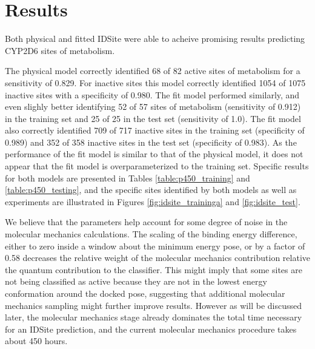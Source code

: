 \section{Results}
\label{section:p450/results}
Both physical and fitted IDSite were able to acheive promising results predicting CYP2D6 sites of metabolism.

The physical model correctly identified 68 of 82 active sites of metabolism for a sensitivity of 0.829.
For inactive sites this model correctly identified 1054 of 1075 inactive sites with a specificity of 0.980.
The fit model performed similarly, and even slighly better identifying 52 of 57 sites of metabolism (sensitivity of 0.912) in the training set and 25 of 25 in the test set (sensitivity of 1.0).
The fit model also correctly identified 709 of 717 inactive sites in the training set (specificity of 0.989) and 352 of 358 inactive sites in the test set (specificity of 0.983).
As the performance of the fit model is similar to that of the physical model, it does not appear that the fit model is overparameterized to the training set.
Specific results for both models are presented in Tables \ref{table:p450_training} and \ref{table:p450_testing}, and the specific sites identified by both models as well as experiments are illustrated in Figures \ref{fig:idsite_traininga} and \ref{fig:idsite_test}. 


We believe that the parameters help account for some degree of noise in the molecular mechanics calculations.
The scaling of the binding energy difference, either to zero inside a window about the minimum energy pose, or by a factor of 0.58 decreases the relative weight of the molecular mechanics contribution relative the quantum contribution to the classifier.
This might imply that some sites are not being classified as active because they are not in the lowest energy conformation around the docked pose, suggesting that additional molecular mechanics sampling might further improve results.
However as will be discussed later, the molecular mechanics stage already dominates the total time necessary for an IDSite prediction, and the current molecular mechanics procedure takes about 450 hours.   








